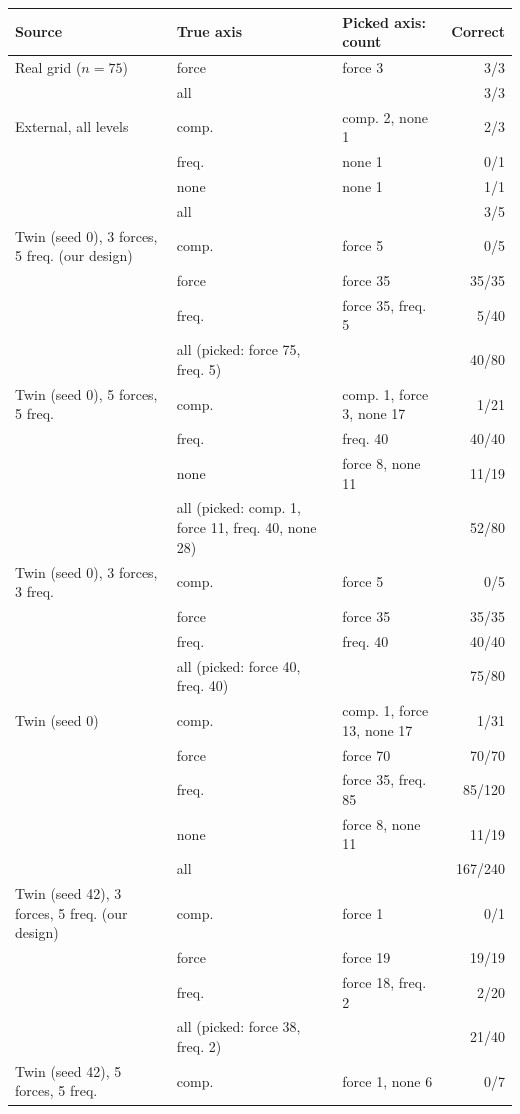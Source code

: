 \begin{tabular}{l l l r}
\toprule
Source & True axis & Picked axis: count & Correct \\
\midrule
Real grid ($n=75$) & force & force 3 & 3/3 \\
 & all & & 3/3 \\
\addlinespace
External, all levels & comp. & comp. 2, none 1 & 2/3 \\
 & freq. & none 1 & 0/1 \\
 & none & none 1 & 1/1 \\
 & all & & 3/5 \\
\addlinespace
Twin (seed 0), 3 forces, 5 freq. (our design) & comp. & force 5 & 0/5 \\
 & force & force 35 & 35/35 \\
 & freq. & force 35, freq. 5 & 5/40 \\
 & all (picked: force 75, freq. 5) & & 40/80 \\
\addlinespace
Twin (seed 0), 5 forces, 5 freq. & comp. & comp. 1, force 3, none 17 & 1/21 \\
 & freq. & freq. 40 & 40/40 \\
 & none & force 8, none 11 & 11/19 \\
 & all (picked: comp. 1, force 11, freq. 40, none 28) & & 52/80 \\
\addlinespace
Twin (seed 0), 3 forces, 3 freq. & comp. & force 5 & 0/5 \\
 & force & force 35 & 35/35 \\
 & freq. & freq. 40 & 40/40 \\
 & all (picked: force 40, freq. 40) & & 75/80 \\
\addlinespace
Twin (seed 0) & comp. & comp. 1, force 13, none 17 & 1/31 \\
 & force & force 70 & 70/70 \\
 & freq. & force 35, freq. 85 & 85/120 \\
 & none & force 8, none 11 & 11/19 \\
 & all & & 167/240 \\
\addlinespace
Twin (seed 42), 3 forces, 5 freq. (our design) & comp. & force 1 & 0/1 \\
 & force & force 19 & 19/19 \\
 & freq. & force 18, freq. 2 & 2/20 \\
 & all (picked: force 38, freq. 2) & & 21/40 \\
\addlinespace
Twin (seed 42), 5 forces, 5 freq. & comp. & force 1, none 6 & 0/7 \\

\end{tabular}
